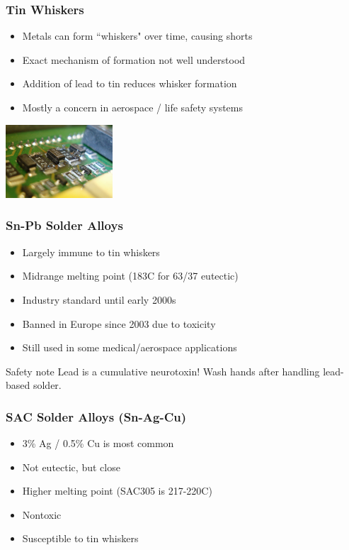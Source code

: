 \documentclass{beamer}
\begin{document}
\begin{frame}
\frametitle{Tin Whiskers}
\begin{itemize}
\item Metals can form ``whiskers" over time, causing shorts
\item Exact mechanism of formation not well understood
\item Addition of lead to tin reduces whisker formation
\item Mostly a concern in aerospace / life safety systems
\end{itemize}
\begin{center}
\includegraphics[width=4cm,keepaspectratio]{whiskers.jpg}
\end{center}
\end{frame}

\begin{frame}
\frametitle{Sn-Pb Solder Alloys}
\begin{itemize}
\item Largely immune to tin whiskers
\item Midrange melting point (183C for 63/37 eutectic)
\item Industry standard until early 2000s
\item Banned in Europe since 2003 due to toxicity
\item Still used in some medical/aerospace applications
\end{itemize}
\begin{alertblock}{Safety note}
Lead is a cumulative neurotoxin! Wash hands after handling lead-based solder.
\end{alertblock}
\end{frame}

\begin{frame}
\frametitle{SAC Solder Alloys (Sn-Ag-Cu)}
\begin{itemize}
\item 3\% Ag / 0.5\% Cu is most common
\item Not eutectic, but close
\item Higher melting point (SAC305 is 217-220C)
\item Nontoxic
\item Susceptible to tin whiskers
\end{itemize}
\end{frame}
\end{document}
